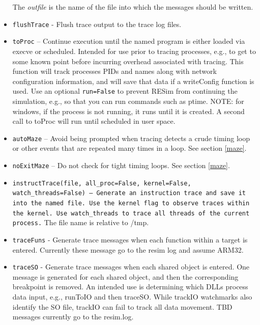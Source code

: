 \documentclass[titlepage]{article}
\begin{document}
\begin{itemize}
The \textit{outfile} is the name of the file into which the messages should be written.

\item {\tt flushTrace} - Flush trace output to the trace log files.

\item {\tt toProc} – Continue execution until the named program is either loaded via execve or scheduled.  Intended for use prior to tracing processes, e.g., to get to some known point before incurring overhead associated with tracing.   This function will track processes PIDs and names along with network configuration information, and will save that data if a writeConfig function is used.
Use an optional {\tt run=False} to prevent RESim from continuing the simulation, e.g., so that you can run commands such as ptime.
NOTE: for windows, if the process is not running, it runs until it is created.  A second call to toProc will run until scheduled in user space.

\item {\tt autoMaze} -- Avoid being prompted when tracing detects a crude timing loop or other events that are repeated many times in a loop.
See section \ref{maze}.

\item {\tt noExitMaze} -- Do not check for tight timing  loops.
See section \ref{maze}.

\item {\tt instructTrace(file, all\_proc=False, kernel=False, watch\_threads=False) -- Generate an instruction trace and save it into the named file. Use the kernel
flag to observe traces within the kernel. Use {\tt watch\_threads} to trace all threads of the current process.}  The file name is relative to /tmp.

\item {\tt traceFuns} - Generate trace messages when each function within a target is entered.  Currently these message go to the resim log and assume ARM32.

\item {\tt traceSO} - Generate trace messages when each shared object is entered.  One message is generated for each shared object, and then the corresponding
breakpoint is removed.  An intended use is determining which DLLs process data input, e.g., runToIO and then traceSO.  While trackIO watchmarks also identify
the SO file, trackIO can fail to track all data movement.  TBD messages currently go to the resim.log.

\end{itemize}
\end{document}
